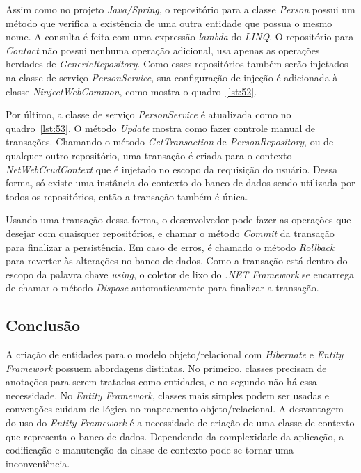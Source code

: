 \documentclass[a4paper,12pt]{article}
\newcommand{\est}[1] {
\textit{#1}}
\newcommand{\classe}[1] {
\textit{#1}}
\newcommand{\lang}[1] {
\textit{#1}}
\newcommand{\metodo}[1] {
\textit{#1}}
\newcommand{\sharpcode}[3] {
	
}
\begin{document}
Assim como no projeto \est{Java/Spring}, o repositório para a classe \classe{Person} possui um método que verifica a existência de uma outra entidade que possua o mesmo nome. A consulta é feita com uma expressão \est{lambda} do \lang{LINQ}. O repositório para \classe{Contact} não possui nenhuma operação adicional, usa apenas as operações herdades de \classe{GenericRepository}. Como esses repositórios também serão injetados na classe de serviço \classe{PersonService}, sua configuração de injeção é adicionada à classe \classe{NinjectWebCommon}, como mostra o quadro~\ref{lst:52}.

\sharpcode{code/52.txt}{Configuração de injeção de repositórios no projeto \est{ASP.NET MVC}}{lst:52}

Por último, a classe de serviço \classe{PersonService} é atualizada como no quadro~\ref{lst:53}. O método \metodo{Update} mostra como fazer controle manual de transações. Chamando o método \metodo{GetTransaction} de \classe{PersonRepository}, ou de qualquer outro repositório, uma transação é criada para o contexto \classe{NetWebCrudContext} que é injetado no escopo da requisição do usuário. Dessa forma, só existe uma instância do contexto do banco de dados sendo utilizada por todos os repositórios, então a transação também é única.

Usando uma transação dessa forma, o desenvolvedor pode fazer as operações que desejar com quaisquer repositórios, e chamar o método \metodo{Commit} da transação para finalizar a persistência. Em caso de erros, é chamado o método \metodo{Rollback} para reverter às alterações no banco de dados. Como a transação está dentro do escopo da palavra chave \est{using}, o coletor de lixo do \est{.NET Framework} se encarrega de chamar o método \metodo{Dispose} automaticamente para finalizar a transação.

\sharpcode{code/53.txt}{Classe \classe{PersonService} utilizando ambos os repositórios no projeto \est{ASP.NET MVC}}{lst:53}

\subsection{Conclusão}

A criação de entidades para o modelo objeto/relacional com \est{Hibernate} e \est{Entity Framework} possuem abordagens distintas. No primeiro, classes precisam de anotações para serem tratadas como entidades, e no segundo não há essa necessidade. No \est{Entity Framework}, classes mais simples podem ser usadas e convenções cuidam de lógica no mapeamento objeto/relacional. A desvantagem do uso do \est{Entity Framework} é a necessidade de criação de uma classe de contexto que representa o banco de dados. Dependendo da complexidade da aplicação, a codificação e manutenção da classe de contexto pode se tornar uma inconveniência.
\end{document}
